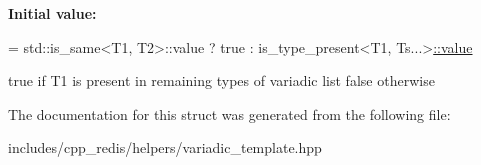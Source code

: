 {\bfseries Initial value\+:}
\begin{DoxyCode}
= std::is\_same<T1, T2>::value
                                  ? true
                                  : is\_type\_present<T1, Ts...>\mbox{\hyperlink{structcpp__redis_1_1helpers_1_1is__type__present_a7b5e8d970ba974a9b58cbc440983c25c}{::value}}
\end{DoxyCode}
true if T1 is present in remaining types of variadic list false otherwise 

The documentation for this struct was generated from the following file\+:\begin{DoxyCompactItemize}
\item 
includes/cpp\+\_\+redis/helpers/variadic\+\_\+template.\+hpp\end{DoxyCompactItemize}
